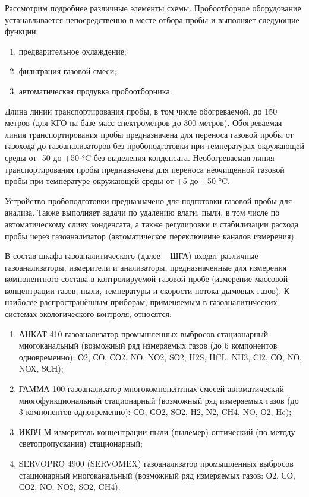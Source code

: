 \documentclass[14pt, a4paper]{extreport}
\begin{document}
	Рассмотрим подробнее различные элементы схемы. Пробоотборное оборудование устанавливается непосредственно в месте отбора пробы и выполняет следующие функции:
	\begin{enumerate}[label={\arabic*)}]
		\item предварительное охлаждение;
		\item фильтрация газовой смеси;
		\item автоматическая продувка пробоотборника.
	\end{enumerate}
	
	Длина линии транспортирования пробы, в том числе обогреваемой, до 150 метров (для КГО на базе масс-спектрометров до 300 метров). Обогреваемая линия транспортирования пробы предназначена для переноса газовой пробы от газохода до газоанализаторов без пробоподготовки при температурах окружающей среды от -50 до +50 °C без выделения конденсата. Необогреваемая линия транспортирования пробы предназначена для переноса неочищенной газовой пробы при температуре окружающей среды от +5 до +50 °C.
	
	Устройство пробоподготовки предназначено для подготовки газовой пробы для анализа. Также выполняет задачи по удалению влаги, пыли, в том числе по автоматическому сливу конденсата, а также регулировки и стабилизации расхода пробы через газоанализатор (автоматическое переключение каналов измерения).
	
	В состав шкафа газоаналитического (далее -- ШГА) входят различные газоанализаторы, измерители и анализаторы, предназначенные для измерения компонентного состава в контролируемой газовой пробе (измерение массовой концентрации газов, пыли, температуры и скорости потока дымовых газов). К наиболее распространённым приборам, применяемым в газоаналитических системах экологического контроля, относятся:
	\begin{enumerate}[label={\arabic*)}]
		\item АНКАТ-410 газоанализатор промышленных выбросов стационарный многоканальный (возможный ряд измеряемых газов (до 6 компонентов одновременно): О2, СО, СО2, NО, NО2, SО2, H2S, НCL, NН3, Cl2, СО, NО, NОХ, SСН);
		\item ГАММА-100 газоанализатор многокомпонентных смесей автоматический многофункциональный стационарный (возможный ряд измеряемых газов (до 3 компонентов одновременно): СО, СО2, SО2, H2, N2, CН4, NO, О2, He);
		\item ИКВЧ-М измеритель концентрации пыли (пылемер) оптический (по методу светопропускания) стационарный;
		\item SERVOPRO 4900 (SERVOMEX) газоанализатор промышленных выбросов стационарный многоканальный (возможный ряд измеряемых газов: О2, СО, СО2, NО, NО2, SО2, CH4).
	\end{enumerate}
	
\end{document}

